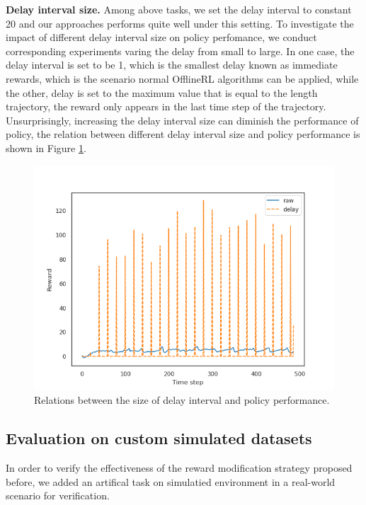 \textbf{Delay interval size.} Among above tasks, we set the delay interval to constant 20 and our approaches
performs quite well under this setting. To investigate the impact of different delay interval size on policy perfomance, we
conduct corresponding experiments varing the delay from small to large. In one case, the delay
interval is set to be 1, which is the smallest delay known as immediate rewards, which is the scenario
normal OfflineRL algorithms can be applied, while the other, delay is set to the maximum value
that is equal to the length trajectory, the reward only appears in the last time step of the trajectory. Unsurprisingly,
increasing the delay interval size can diminish the performance of policy, the relation between different delay
interval size and policy performance is shown in Figure \ref{fig:fig2}.

\begin{figure}[H]
    \centering
    \includegraphics[width=\textwidth]{assets/delay_mode-constant-delay-20_0_delayed.png}

    \caption{Relations between the size of delay interval and policy performance.}
    \label{fig:fig2}
\end{figure}

\subsection{Evaluation on custom simulated datasets}

In order to verify the effectiveness of the reward modification strategy proposed before, we added an artifical task on simulatied environment
in a real-world scenario for verification.

